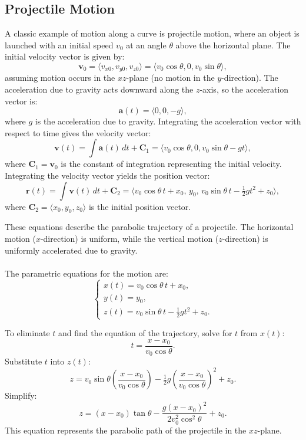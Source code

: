 \subsection*{Projectile Motion} 

\noindent A classic example of motion along a curve is projectile motion, where an object is launched with an initial speed \( v_0 \) at an angle \( \theta \) above the horizontal plane. The initial velocity vector is given by:
\[
\mathbf{v}_0 = \langle v_{x0}, v_{y0}, v_{z0} \rangle = \langle v_0 \cos \theta, 0, v_0 \sin \theta \rangle,
\]
assuming motion occurs in the \( xz \)-plane (no motion in the \( y \)-direction). The acceleration due to gravity acts downward along the \( z \)-axis, so the acceleration vector is:
\[
\mathbf{a}(t) = \langle 0, 0, -g \rangle,
\]
where \( g \) is the acceleration due to gravity. Integrating the acceleration vector with respect to time gives the velocity vector:
\[
\mathbf{v}(t) = \int \mathbf{a}(t) \, dt + \mathbf{C}_1 = \langle v_0 \cos \theta, 0, v_0 \sin \theta - gt \rangle,
\]
where \( \mathbf{C}_1 = \mathbf{v}_0 \) is the constant of integration representing the initial velocity. Integrating the velocity vector yields the position vector:
\[
\mathbf{r}(t) = \int \mathbf{v}(t) \, dt + \mathbf{C}_2 = \langle v_0 \cos \theta \, t + x_0, \, y_0, \, v_0 \sin \theta \, t - \tfrac{1}{2} gt^2 + z_0 \rangle,
\]
where \( \mathbf{C}_2 = \langle x_0, y_0, z_0 \rangle \) is the initial position vector.

\vspace{2mm}

\noindent These equations describe the parabolic trajectory of a projectile. The horizontal motion (\( x \)-direction) is uniform, while the vertical motion (\( z \)-direction) is uniformly accelerated due to gravity. \\ \\ The parametric equations for the motion are:
\[
\begin{cases}
x(t) = v_0 \cos \theta \, t + x_0, \\
y(t) = y_0, \\
z(t) = v_0 \sin \theta \, t - \tfrac{1}{2} gt^2 + z_0.
\end{cases}
\]

\noindent To eliminate \( t \) and find the equation of the trajectory, solve for \( t \) from \( x(t) \):
\[
t = \frac{x - x_0}{v_0 \cos \theta}.
\]
\noindent Substitute \( t \) into \( z(t) \):
\[
z = v_0 \sin \theta \left( \frac{x - x_0}{v_0 \cos \theta} \right) - \tfrac{1}{2} g \left( \frac{x - x_0}{v_0 \cos \theta} \right)^2 + z_0.
\]
\noindent Simplify:
\[
z = (x - x_0) \tan \theta - \frac{g (x - x_0)^2}{2 v_0^2 \cos^2 \theta} + z_0.
\]
\noindent This equation represents the parabolic path of the projectile in the \( xz \)-plane.

